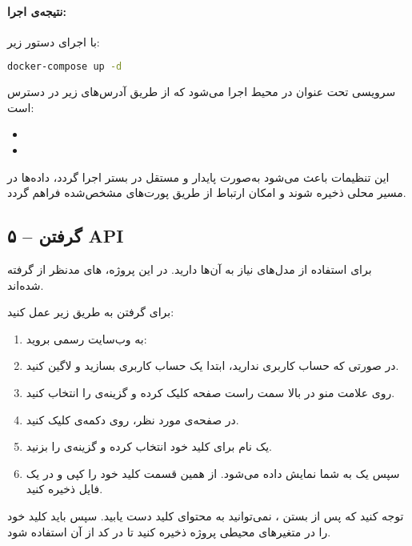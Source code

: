 \documentclass{article}
\begin{document}
\paragraph{نتیجه‌ی اجرا:}
با اجرای دستور زیر:
\begin{latin}
\begin{lstlisting}[language=bash]
docker-compose up -d
\end{lstlisting}
\end{latin}

سرویسی تحت عنوان  در محیط  اجرا می‌شود که از طریق آدرس‌های زیر در دسترس است:
\begin{itemize}
    \item {}
    \item {}
\end{itemize}

این تنظیمات باعث می‌شود  به‌صورت پایدار و مستقل در بستر  اجرا گردد، داده‌ها در مسیر محلی ذخیره شوند و امکان ارتباط از طریق پورت‌های مشخص‌شده فراهم گردد.

\subsection{۵ – گرفتن API}
برای استفاده از مدل‌های  نیاز به  آن‌ها دارید.  
در این پروژه، های مدنظر از  گرفته شده‌اند.

برای گرفتن  به طریق زیر عمل کنید:
\begin{enumerate}
    \item به وب‌سایت رسمی  بروید: 
    \item در صورتی که حساب کاربری ندارید، ابتدا یک حساب کاربری بسازید و لاگین کنید.
    \item روی علامت منو در بالا سمت راست صفحه کلیک کرده و گزینه‌ی  را انتخاب کنید.
    \item در صفحه‌ی مورد نظر، روی دکمه‌ی  کلیک کنید.
    \item یک نام برای کلید خود انتخاب کرده و گزینه‌ی  را بزنید.
    \item سپس یک  به شما نمایش داده می‌شود. از همین قسمت کلید خود را کپی و در یک فایل ذخیره کنید.
\end{enumerate}

توجه کنید که پس از بستن ، نمی‌توانید به محتوای کلید دست یابید.  
سپس باید کلید خود را در متغیرهای محیطی پروژه ذخیره کنید تا در کد از آن استفاده شود.
\end{document}
